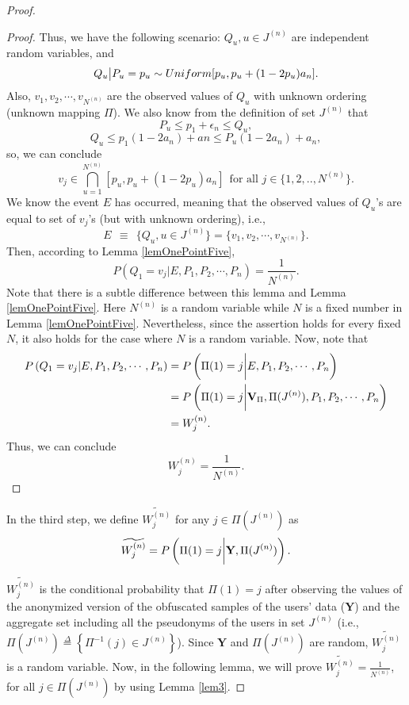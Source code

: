 \begin{proof}
\begin{proof}
Thus, we have the following scenario: $Q_u, u \in  J^{(n)}$ are independent random variables, and
\[Q_u\big{|} P_u=p_u \sim Uniform [p_u, p_u+(1-2p_u)a_n]. \]
Also, $v_1, v_2, \cdots, v_{N^{(n)}}$ are the observed values of $Q_u$ with unknown ordering (unknown mapping $\Pi$). We also know from the definition of set $J^{(n)}$ that
\[P_u \leq p_1+\epsilon_n \leq Q_u,\]
\[Q_u \leq p_1(1-2a_n)+an \leq P_u(1-2a_n)+a_n,\]
so, we can conclude
\[ v_j \in \bigcap_{u=1}^{N^{(n)}} [p_u, p_u+(1-2p_u)a_n] \ \ \textrm{for all }j \in \{1,2,..,N^{(n)}\}. \]
We know the event $E$ has occurred, meaning that the observed values of $Q_u$'s are equal to set of $v_j$'s (but with unknown ordering), i.e.,
\[E \ \ \equiv \ \ \{Q_u, u \in  J^{(n)}\}= \{ v_1, v_2, \cdots, v_{N^{(n)}} \}. \]
Then, according to Lemma \ref{lemOnePointFive},
\[P\left(Q_1=v_j |E, P_1, P_2, \cdots, P_n \right)=\frac{1}{N^{(n)}}. \]
Note that there is a subtle difference between this lemma and Lemma \ref{lemOnePointFive}. Here $N^{(n)}$ is a random variable while $N$ is a fixed number in Lemma \ref{lemOnePointFive}. Nevertheless, since the assertion holds for every fixed $N$, it also holds for the case where $N$ is a random variable. Now, note that
\begin{align*}
P\left(Q_1=v_j |E, P_1, P_2, \cdots, P_n \right) &= P\left(\Pi(1)=j \bigg{|} E, P_1, P_2, \cdots, P_n \right)\\
&=P\left(\Pi(1)=j \bigg{|} \textbf{V}_{\Pi}, \Pi (J^{(n)}), P_1, P_2, \cdots, P_n \right)\\
&=W_j^{(n)}.
\end{align*}
Thus, we can conclude
		\[W_j^{(n)}=\frac{1}{N^{(n)}}.\]
\end{proof}	
%
%
In the third step, we define $\widetilde{W_j^{(n)}}$ for any $j \in \Pi (J^{(n)})$ as
\[\widetilde{W_j^{(n)}} = P\left(\Pi(1)=j \bigg{|} \textbf{Y}, \Pi (J^{(n)})\right).\]

$\widetilde{W_j^{(n)}}$ is the conditional probability that $\Pi(1)=j$ after observing the values of the anonymized version of the obfuscated samples of the users' data ($\textbf{Y}$) and the aggregate set including all the pseudonyms of the users in set $J^{(n)}$ (i.e., $\Pi(J^{(n)})\overset{\Delta}{=} \left\{\Pi^{-1}(j) \in J^{(n)}\right\}$). Since $\textbf{Y}$ and $\Pi (J^{(n)})$ are random, $\widetilde{W_j^{(n)}} $ is a random variable. Now, in the following lemma, we will prove $\widetilde{W_j^{(n)}} =\frac{1}{N^{(n)}}$, for all $j \in \Pi (J^{(n)})$ by using Lemma \ref{lem3}.


\end{proof}
